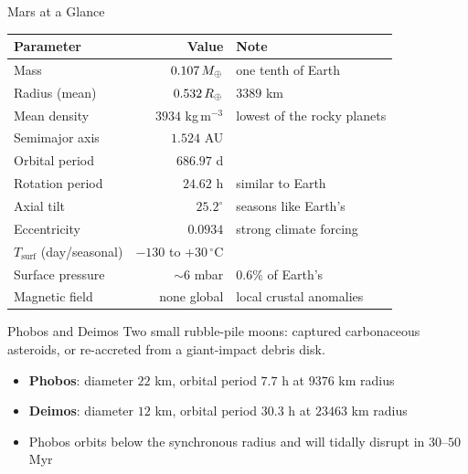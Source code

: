 \documentclass[aspectratio=169, 11pt]{beamer}
\begin{document}
\begin{frame}{Mars at a Glance}
  \centering
  \small
  \begin{tabular}{l r l}
    \toprule
    \textbf{Parameter} & \textbf{Value} & \textbf{Note} \\
    \midrule
    Mass & $0.107\,M_{\oplus}$ & one tenth of Earth \\
    Radius (mean) & $0.532\,R_{\oplus}$ & $3389$ km \\
    Mean density & $3934$ kg\,m$^{-3}$ & lowest of the rocky planets \\
    Semimajor axis & $1.524$ AU & \\
    Orbital period & $686.97$ d & \\
    Rotation period & $24.62$ h & similar to Earth \\
    Axial tilt & $25.2^\circ$ & seasons like Earth's \\
    Eccentricity & $0.0934$ & strong climate forcing \\
    $T_{\mathrm{surf}}$ (day/seasonal) & $-130$ to $+30$\,$^\circ$C & \\
    Surface pressure & $\sim 6$ mbar & $0.6\%$ of Earth's \\
    Magnetic field & none global & local crustal anomalies \\
    \bottomrule
  \end{tabular}
  \vskip6pt
\end{frame}

\begin{frame}
\end{frame}

\begin{frame}{Phobos and Deimos}
  Two small rubble-pile moons: captured carbonaceous asteroids, or re-accreted from a giant-impact debris disk.
  \vskip8pt
  \begin{itemize}
    \item \textbf{Phobos}: diameter $22$ km, orbital period $7.7$ h at $9376$ km radius
    \item \textbf{Deimos}: diameter $12$ km, orbital period $30.3$ h at $23463$ km radius
    \item Phobos orbits below the synchronous radius and will tidally disrupt in $30$--$50$ Myr
  \end{itemize}
\end{frame}
\end{document}
